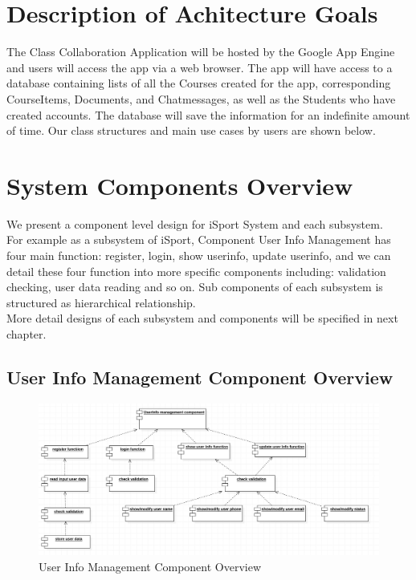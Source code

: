 \documentclass[16pt]{scrreprt}
\begin{document}
\section{Description of Achitecture Goals}
The Class Collaboration Application will be hosted by the Google App Engine and users will access the app via a web browser. The app will have access to a database containing lists of all the Courses created for the app, corresponding CourseItems, Documents, and Chatmessages, as well as the Students who have created accounts. The database will save the information for an indefinite amount of time. Our class structures and main use cases by users are shown below. 

\section{System Components Overview}
We present a component level design for iSport System and each subsystem.\\

\noindent For example as a subsystem of iSport, Component User Info Management has four main function: register, login, show userinfo, update userinfo, and we can detail these four function into more specific components including: validation checking, user data reading and so on. Sub components of each subsystem is structured as hierarchical relationship.\\

\noindent More detail designs of each subsystem and components will be specified in next chapter.
 
\subsection{User Info Management Component Overview} 
\begin{figure}[H]
  \centering
  \includegraphics[width=1\textwidth]{diagrams/userinfocom.png}
  \caption{User Info Management Component Overview}
\end{figure}
\end{document}
